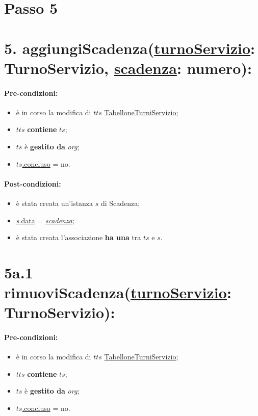 \section{Passo 5}
\section*{5. aggiungiScadenza(\underline{turnoServizio}: TurnoServizio, \underline{scadenza}: numero):}

\paragraph{Pre-condizioni:}
\begin{itemize}
 \item è in corso la modifica di $tts$ \underline{TabelloneTurniServizio};
    \item $tts$ \textbf{contiene} $ts$;
     \item $ts$ è \textbf{gestito da} {\textit{org}};
   \item \underline{$ts$.concluso} = no.
\end{itemize}

\paragraph{Post-condizioni:}  
\begin{itemize}
 \item è stata creata un'istanza $s$ di Scadenza;
 \item \underline{\textit{s}.data} = \underline{\textit{scadenza}};
 \item è stata creata l'associazione \textbf{ha una} tra $ts$ e $s$.
\end{itemize}

\section*{5a.1 rimuoviScadenza(\underline{turnoServizio}: TurnoServizio):}

\paragraph{Pre-condizioni:}
\begin{itemize}
 \item è in corso la modifica di $tts$ \underline{TabelloneTurniServizio};
    \item $tts$ \textbf{contiene} $ts$;
     \item $ts$ è \textbf{gestito da} \textit{org};
   \item \underline{$ts$.concluso} = no.
\end{itemize}

